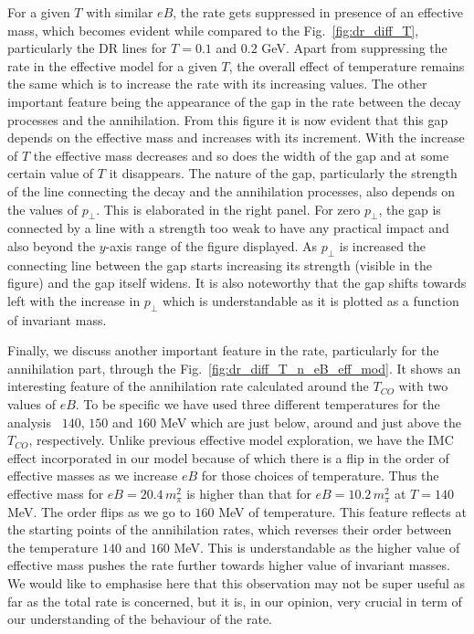 \documentclass[aps,prd,floatfix,showpacs,showkeys,superscriptadress,unsortedaddress,nofootinbib,onecolumn]{revtex4-1}
\newcommand{\sperp}{\scriptscriptstyle{\perp}}
\begin{document}
For a given $T$ with similar $eB$, the rate gets suppressed in presence of an effective mass, which becomes evident while compared to the Fig.~\ref{fig:dr_diff_T}, particularly the DR lines for $T=0.1$ and $0.2$ GeV. Apart from suppressing the rate in the effective model for a given $T$, the overall effect of temperature remains the same which is to increase the rate with its increasing values. The other important feature being the appearance of the gap in the rate between the decay processes and the annihilation. From this figure it is now evident that this gap depends on the effective mass and increases with its increment. With the increase of $T$ the effective mass decreases and so does the width of the gap and at some certain value of $T$ it disappears. The nature of the gap, particularly the strength of the line connecting the decay and the annihilation processes, also depends on the values of $p_{\sperp}$. This is elaborated in the right panel.  For zero $p_{\sperp}$, the gap is connected by a line with a strength too weak to have any practical impact and also beyond the $y$-axis range of the figure displayed. As $p_{\sperp}$ is increased the connecting line between the gap starts increasing its strength (visible in the figure) and the gap itself widens. It is also noteworthy that the gap shifts towards left with the increase in $p_{\sperp}$ which is understandable as it is plotted as a function of invariant mass.

Finally, we discuss another important feature in the rate, particularly for the annihilation part, through the Fig.~\ref{fig:dr_diff_T_n_eB_eff_mod}. It shows an interesting feature of the annihilation rate calculated around the $T_{CO}$ with two values of $eB$. To be specific we have used three different temperatures for the analysis \textemdash\, $140$, $150$ and $160$ MeV which are just below, around and just above the $T_{CO}$, respectively. Unlike previous effective model exploration, we have the IMC effect incorporated in our model because of which there is a flip in the order of effective masses as we increase $eB$ for those choices of temperature. Thus the effective mass for $eB=20.4\, m_\pi^2$ is higher than that for $eB=10.2\, m_\pi^2$ at $T=140$ MeV. The order flips as we go to $160$ MeV of temperature. This feature reflects at the starting points of the annihilation rates, which reverses their order between the temperature $140$ and $160$ MeV. This is understandable as the higher value of effective mass pushes the rate further towards higher value of invariant masses. We would like to emphasise here that this observation may not be super useful as far as the total rate is concerned, but it is, in our opinion, very crucial in term of our understanding of the behaviour of the rate.
\end{document}
